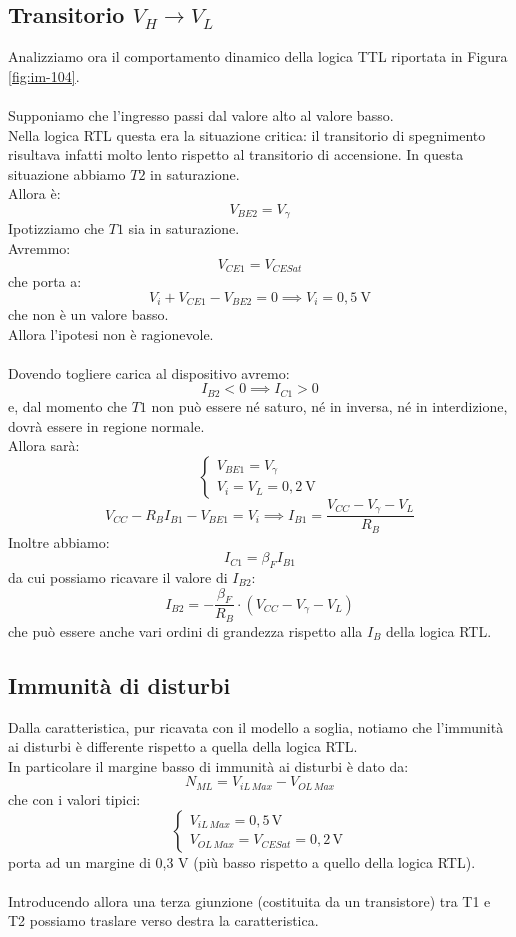 \documentclass[../main.tex]{subfiles}
\begin{document}
	\subsection{Transitorio $V_H \longrightarrow V_L$}
	Analizziamo ora il comportamento dinamico della logica TTL riportata in Figura \ref{fig:im-104}.\\\\
	Supponiamo che l'ingresso passi dal valore alto al valore basso.\\
	Nella logica RTL questa era la situazione critica: il transitorio di spegnimento risultava infatti molto lento rispetto al transitorio di accensione.
	In questa situazione abbiamo $T2$ in saturazione.\\
	Allora è:
	\[ V_{BE2} = V_\gamma \]
	Ipotizziamo che $T1$ sia in saturazione.\\
	Avremmo:
	\[ V_{CE1} = V_{CESat} \]
	che porta a:
	\[ V_i + V_{CE1} - V_{BE2} = 0 \implies V_i = 0,5\ \text{V} \]
	che non è un valore basso.\\
	Allora l'ipotesi non è ragionevole.\\\\
	Dovendo togliere carica al dispositivo avremo:
	\[ I_{B2} < 0 \implies I_{C1} > 0 \]
	e, dal momento che $T1$ non può essere né saturo, né in inversa, né in interdizione, dovrà essere in regione normale.\\
	Allora sarà:
	\[ \begin{cases} V_{BE1} = V_\gamma \\ V_i = V_L = 0,2\ \text{V} \end{cases} \]
	\[ V_{CC} - R_B I_{B1} - V_{BE1} = V_i \implies I_{B1} = \frac{V_{CC} - V_\gamma - V_L}{R_B} \]
	Inoltre abbiamo:
	\[ I_{C1} = \beta_F I_{B1} \]
	da cui possiamo ricavare il valore di $I_{B2}$:
	\[ I_{B2} = -\frac{\beta_F}{R_B} \cdot (V_{CC} - V_\gamma - V_L) \]
	che può essere anche vari ordini di grandezza rispetto alla $I_B$ della logica RTL.
	\subsection{Immunità di disturbi}
	Dalla caratteristica, pur ricavata con il modello a soglia, notiamo che l'immunità ai disturbi è differente rispetto a quella della logica RTL.\\
	In particolare il margine basso di immunità ai disturbi è dato da:
	\[ N_{ML} = V_{iL\,Max} - V_{OL\,Max} \]
	che con i valori tipici:
	\[ \left\{ \begin{array}{l} V_{iL\,Max} = 0,5\,\mathrm{V} \\ V_{OL\,Max} = V_{CESat} = 0,2\,\mathrm{V} \end{array} \right. \]
	porta ad un margine di 0,3 V (più basso rispetto a quello della logica RTL).\\\\
	Introducendo allora una terza giunzione (costituita da un transistore) tra T1 e T2 possiamo traslare verso destra la caratteristica.
\end{document}
